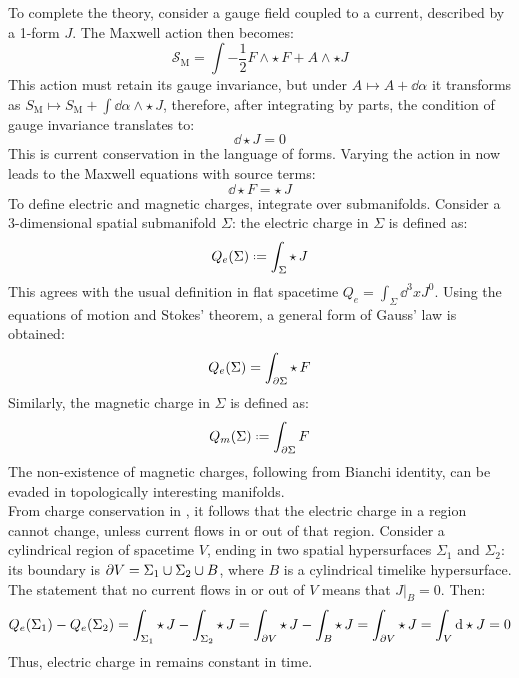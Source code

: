 To complete the theory, consider a gauge field coupled to a current, described by a 1-form $ J $. The Maxwell action then becomes:
\begin{equation}
  \mathcal{S}_{\text{M}} = \int - \frac{1}{2} F \wedge \star\, F + A \wedge \star J
\end{equation}
This action must retain its gauge invariance, but under $ A \mapsto A + \dd \alpha $ it transforms as $ S_{\text{M}} \mapsto S_{\text{M}} + \int \dd \alpha \wedge \star\, J $, therefore, after integrating by parts, the condition of gauge invariance translates to:
\begin{equation}
  \dd \star J = 0
  \label{eq:charge-cons}
\end{equation}
This is current conservation in the language of forms. Varying the action in  now leads to the Maxwell equations with source terms:
\begin{equation}
  \dd \star F = \star\, J
\end{equation}
To define electric and magnetic charges, integrate over submanifolds. Consider a 3-dimensional spatial submanifold $ \Sigma $: the electric charge in $ \Sigma $ is defined as:
\begin{equation}
  Q_e(\Sigma) \defeq \int_{\Sigma} \star\, J
\end{equation}
This agrees with the usual definition in flat spacetime $ Q_e = \int_{\Sigma} \dd^3 x J^0 $. Using the equations of motion and Stokes' theorem, a general form of Gauss' law is obtained:
\begin{equation}
  Q_e(\Sigma) = \int_{\partial \Sigma} \star\, F
  \label{eq:electric-charge}
\end{equation}
Similarly, the magnetic charge in $ \Sigma $ is defined as:
\begin{equation}
  Q_m(\Sigma) \defeq \int_{\pa \Sigma} F
\end{equation}
The non-existence of magnetic charges, following from Bianchi identity, can be evaded in topologically interesting manifolds.\\
From charge conservation in , it follows that the electric charge in a region cannot change, unless current flows in or out of that region. Consider a cylindrical region of spacetime $ V $, ending in two spatial hypersurfaces $ \Sigma_1 $ and $ \Sigma_2 $: its boundary is $ \partial V = \Sigma_1 \cup \Sigma_2 \cup B $, where $ B $ is a cylindrical timelike hypersurface. The statement that no current flows in or out of $ V $ means that $ J \vert_B = 0 $. Then:
\begin{equation*}
  Q_e(\Sigma_1) - Q_e(\Sigma_2) = \int_{\Sigma_1} \star\, J - \int_{\Sigma_2} \star\, J = \int_{\partial V} \star\, J - \int_B \star\, J = \int_{\partial V} \star\, J = \int_V \mathrm{d} \star J = 0
\end{equation*}
Thus, electric charge in remains constant in time.


